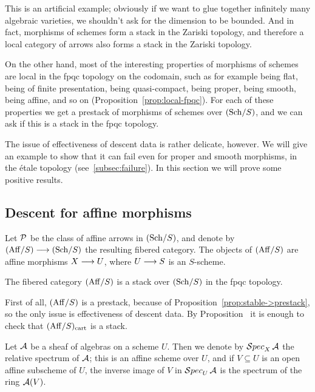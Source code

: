 \begin{4   STACKS}
\begin{4.3 Descent for morphisms of schemes}
This is an artificial example; obviously if we want to glue together infinitely many algebraic varieties, we shouldn't ask for the dimension to be bounded. And in fact, morphisms of schemes form a stack in the Zariski topology, and therefore a local category of arrows also forms a stack in the Zariski topology. 

On the other hand, most of the interesting properties of morphisms of schemes are local in the fpqc topology on the codomain, such as for example being flat, being of finite presentation, being quasi-compact, being proper, being smooth, being affine, and so on (Proposition~\ref{prop:local-fpqc}). For each of these properties we get a prestack of morphisms of schemes over $({\mathrm{Sch}/S})$, and we can ask if this is a stack in the fpqc topology. 

The issue of effectiveness of descent data is rather delicate, however. We will give an example to show that it can fail even for proper and smooth morphisms, in the \'etale topology (see~\ref{subsec:failure}). In this section we will prove some positive results.



\subsection{Descent for affine morphisms}
\label{subsec:affine-descent}

Let $\mathcal{P}$ be the class of affine arrows in $({\mathrm{Sch}/S})$, and denote by $\cataff{S} \arr \catsch{S}$ the resulting fibered category. The objects of $({\mathrm{Aff}/S})$ are affine morphisms $X \arr U$, where $U \arr S$ is an $S$-scheme.

\begin{theorem}\label{thm:affine-stack}
The fibered category $({\mathrm{Aff}/S})$ is a stack over $({\mathrm{Sch}/S})$ in the fpqc topology.
\end{theorem}

First of all, $({\mathrm{Aff}/S})$ is a prestack, because of Proposition~\ref{prop:stable->prestack}, so the only issue is effectiveness of descent data. By Proposition~ it is enough to check that $({\mathrm{Aff}/S})_\mathrm{cart}$ is a stack.

Let $\mathcal{A}$ be a \qc sheaf of algebras on a scheme $U$. Then we denote by $\mathop{\mathcal{S}pec}_X \mathcal{A}$ the relative spectrum of $\mathcal{A}$; this is an affine scheme over $U$, and if $V \subseteq U$ is an open affine subscheme of $U$, the inverse image of $V$ in $\mathop{\mathcal{S}pec}_U \mathcal{A}$ is the spectrum of the ring $\mathcal{A}(V)$.


\end{4.3 Descent for morphisms of schemes}
\end{4   STACKS}
